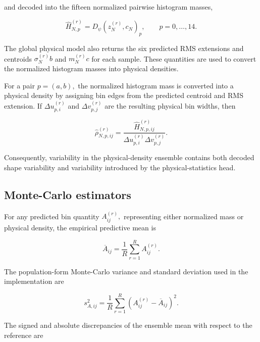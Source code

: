 and decoded into the fifteen normalized pairwise histogram masses,

\begin{equation}
\label{eq:165}
\widehat H_{N,p}^{(r)}=D_{\psi}(z_N^{(r)},c_N)_p,\qquad p=0,\ldots,14.
\end{equation}

The global physical model also returns the six predicted RMS extensions and centroids \(\sigma_{N}^{( r )} b\) and \(m_{N}^{( r )} c\) for each sample. These quantities are used to convert the normalized histogram masses into physical densities.

For a pair \(p = ( a , b ) ,\) the normalized histogram mass is converted into a physical density by assigning bin edges from the predicted centroid and RMS extension. If \(\Delta u_{p , i}^{( r )}\) and \(\Delta v_{p , j}^{( r )}\) are the resulting physical bin widths, then

\begin{equation}
\label{eq:166}
\widehat\rho_{N,p,ij}^{(r)}=\frac{\widehat H_{N,p,ij}^{(r)}}{\Delta u_{p,i}^{(r)}\Delta v_{p,j}^{(r)}}.
\end{equation}

Consequently, variability in the physical-density ensemble contains both decoded shape variability and variability introduced by the physical-statistics head.

\subsection{Monte-Carlo estimators}
\label{sec:04_machine_learning_methodology_monte_carlo_estimators}

For any predicted bin quantity \(A_{i j}^{( r )} ,\) representing either normalized mass or physical density, the empirical predictive mean is

\begin{equation}
\label{eq:167}
\overline A_{ij}=\frac1R\sum_{r=1}^{R}A_{ij}^{(r)}.
\end{equation}

The population-form Monte-Carlo variance and standard deviation used in the implementation are

\begin{equation}
\label{eq:168}
s_{A,ij}^{2}=\frac1R\sum_{r=1}^{R}\left(A_{ij}^{(r)}-\overline A_{ij}\right)^2.
\end{equation}

The signed and absolute discrepancies of the ensemble mean with respect to the reference are

